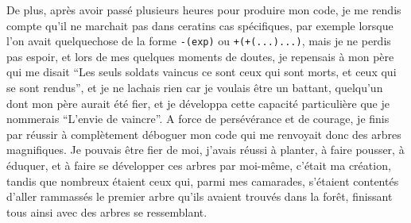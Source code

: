 \documentclass{report}
\begin{document}
De plus, après avoir passé plusieurs heures pour produire mon code, je me rendis compte qu'il ne marchait pas dans ceratins cas spécifiques, par exemple lorsque l'on avait quelquechose de la forme \verb|-(exp)| ou \verb|+(+(...)...)|, mais je ne perdis pas espoir, et lors de mes quelques moments de doutes, je repensais à mon père qui me disait ``Les seuls soldats vaincus ce sont ceux qui sont morts, et ceux qui se sont rendus'', et je ne lachais rien car je voulais être un battant, quelqu'un dont mon père aurait été fier, et je développa cette capacité particulière que je nommerais ``L'envie de vaincre''. A force de persévérance et de courage, je finis par réussir à complètement déboguer mon code qui me renvoyait donc des arbres magnifiques. Je pouvais être fier de moi, j'avais réussi à planter, à faire pousser, à éduquer, et à faire se développer ces arbres par moi-même, c'était ma création, tandis que nombreux étaient ceux qui, parmi mes camarades, s'étaient contentés d'aller rammassés le premier arbre qu'ils avaient trouvés dans la forêt, finissant tous ainsi avec des arbres se ressemblant.
\end{document}

